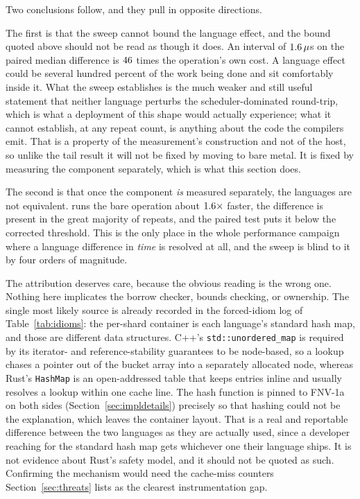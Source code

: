 \documentclass[english,twoside,openright,a4paper,censored,csm,software-track-2020]{HYthesisML}
\begin{document}
Two conclusions follow, and they pull in opposite directions.

The first is that the sweep cannot bound the language effect, and the bound quoted above should
not be read as though it does. An interval of $1.6\,\mu$s on the paired median
difference is $46$ times the operation's own cost. A language effect could be
several hundred percent of the work being done and sit comfortably inside it. What the sweep
establishes is the much weaker and still useful statement that neither language perturbs the
scheduler-dominated round-trip, which is what a deployment of this shape would actually
experience; what it cannot establish, at any repeat count, is anything about the code the
compilers emit. That is a property of the measurement's construction and not of the host,
so unlike the tail result it will not be fixed by moving to bare metal. It is fixed by
measuring the component separately, which is what this section does.

The second is that once the component \emph{is} measured separately, the languages are not
equivalent. \BudgetCoreFaster{} runs the bare operation about $1.6\times$ faster,
the difference is present in the great majority of repeats, and the paired test puts it below
the corrected threshold. This is the only place in the whole performance campaign where a
language difference in \emph{time} is resolved at all, and the sweep is blind to it by four
orders of magnitude.

The attribution deserves care, because the obvious reading is the wrong one. Nothing here
implicates the borrow checker, bounds checking, or ownership. The single most likely source is
already recorded in the forced-idiom log of Table~\ref{tab:idioms}: the per-shard container is
each language's standard hash map, and those are different data structures. C++'s
\texttt{std::unordered\_map} is required by its iterator- and reference-stability guarantees to
be node-based, so a lookup chases a pointer out of the bucket array into a separately allocated
node, whereas Rust's \texttt{HashMap} is an open-addressed table that keeps entries inline and
usually resolves a lookup within one cache line. The hash function is pinned to FNV-1a on both
sides (Section~\ref{sec:impldetails}) precisely so that hashing could not be the explanation,
which leaves the container layout. That is a real and reportable difference between the two
languages as they are actually used, since a developer reaching for the standard hash map gets
whichever one their language ships. It is not evidence about Rust's safety model, and it should
not be quoted as such. Confirming the mechanism would need the cache-miss counters
Section~\ref{sec:threats} lists as the clearest instrumentation gap.
\end{document}
